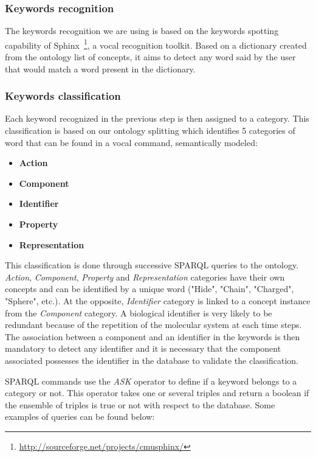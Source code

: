 \documentclass{vgtc}                          %
\begin{document}
\subsubsection{Keywords recognition}

The keywords recognition we are using is based on the keywords spotting capability of Sphinx~\footnote{\url{http://sourceforge.net/projects/cmusphinx/}}, a vocal recognition toolkit. Based on a dictionary created from the ontology list of concepts, it aims to detect any word said by the user that would match a word present in the dictionary.

\subsubsection{Keywords classification}

Each keyword recognized in the previous step is then assigned to a category. This classification is based on our ontology splitting which identifies 5 categories of word that can be found in a vocal command, semantically modeled:

\begin{itemize}
  \item \textbf{Action}
  \item \textbf{Component}
  \item \textbf{Identifier}
  \item \textbf{Property}
  \item \textbf{Representation}
\end{itemize}

This classification is done through successive SPARQL queries to the ontology. \textit{Action}, \textit{Component}, \textit{Property} and \textit{Representation} categories have their own concepts and can be identified by a unique word ("Hide", "Chain", "Charged", "Sphere", etc.). At the opposite, \textit{Identifier} category is linked to a concept instance from the \textit{Component} category. A biological identifier is very likely to be redundant because of the repetition of the molecular system at each time steps. The association between a component and an identifier in the keywords is then mandatory to detect any identifier and it is necessary that the component associated possesses the identifier in the database to validate the classification. 

SPARQL commands use the \textit{ASK} operator to define if a keyword belongs to a category or not. This operator takes one or several triples and return a boolean if the ensemble of triples is true or not with respect to the database. Some examples of queries can be found below:
\end{document}
